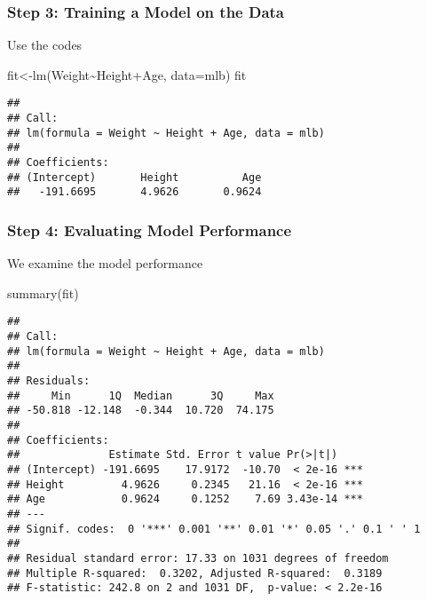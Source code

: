 \documentclass[
]{article}
\newenvironment{Shaded}{\begin{snugshade}}{\end{snugshade}}
\newcommand{\AttributeTok}[1]{\textcolor[rgb]{0.77,0.63,0.00}{#1}}
\newcommand{\FunctionTok}[1]{\textcolor[rgb]{0.00,0.00,0.00}{#1}}
\newcommand{\NormalTok}[1]{#1}
\newcommand{\OtherTok}[1]{\textcolor[rgb]{0.56,0.35,0.01}{#1}}
\newcommand{\SpecialCharTok}[1]{\textcolor[rgb]{0.00,0.00,0.00}{#1}}
\begin{document}
\hypertarget{step-3-training-a-model-on-the-data}{%
\subsubsection{Step 3: Training a Model on the
Data}\label{step-3-training-a-model-on-the-data}}

Use the codes

\begin{Shaded}
\begin{Highlighting}[]
\NormalTok{fit}\OtherTok{\textless{}{-}}\FunctionTok{lm}\NormalTok{(Weight}\SpecialCharTok{\textasciitilde{}}\NormalTok{Height}\SpecialCharTok{+}\NormalTok{Age, }\AttributeTok{data=}\NormalTok{mlb)}
\NormalTok{fit}
\end{Highlighting}
\end{Shaded}

\begin{verbatim}
## 
## Call:
## lm(formula = Weight ~ Height + Age, data = mlb)
## 
## Coefficients:
## (Intercept)       Height          Age  
##   -191.6695       4.9626       0.9624
\end{verbatim}

\hypertarget{step-4-evaluating-model-performance}{%
\subsubsection{Step 4: Evaluating Model
Performance}\label{step-4-evaluating-model-performance}}

We examine the model performance

\begin{Shaded}
\begin{Highlighting}[]
\FunctionTok{summary}\NormalTok{(fit)}
\end{Highlighting}
\end{Shaded}

\begin{verbatim}
## 
## Call:
## lm(formula = Weight ~ Height + Age, data = mlb)
## 
## Residuals:
##     Min      1Q  Median      3Q     Max 
## -50.818 -12.148  -0.344  10.720  74.175 
## 
## Coefficients:
##              Estimate Std. Error t value Pr(>|t|)    
## (Intercept) -191.6695    17.9172  -10.70  < 2e-16 ***
## Height         4.9626     0.2345   21.16  < 2e-16 ***
## Age            0.9624     0.1252    7.69 3.43e-14 ***
## ---
## Signif. codes:  0 '***' 0.001 '**' 0.01 '*' 0.05 '.' 0.1 ' ' 1
## 
## Residual standard error: 17.33 on 1031 degrees of freedom
## Multiple R-squared:  0.3202, Adjusted R-squared:  0.3189 
## F-statistic: 242.8 on 2 and 1031 DF,  p-value: < 2.2e-16
\end{verbatim}
\end{document}
